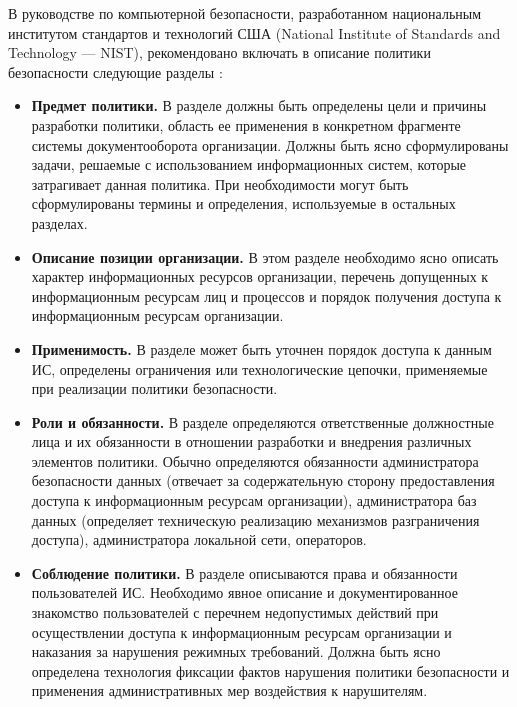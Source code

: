 В руководстве по компьютерной безопасности, разработанном национальным институтом стандартов и технологий
США (National Institute of Standards and Technology — NIST), рекомендовано включать в описание
политики безопасности следующие разделы  \autocite{nurzhanov}:
\begin{itemize}
	\item \textbf{Предмет политики.}
        В разделе должны быть определены цели и причины разработки политики, область ее применения
        в конкретном фрагменте системы документооборота организации. Должны быть ясно сформулированы
        задачи, решаемые с использованием информационных систем, которые затрагивает данная политика.
        При необходимости могут быть сформулированы термины и определения, используемые в остальных разделах.

    \item \textbf{Описание позиции организации.}
        В этом разделе необходимо ясно описать характер информационных ресурсов организации, перечень
        допущенных к информационным ресурсам лиц и процессов и порядок получения доступа к информационным
        ресурсам организации.

    \item \textbf{Применимость.}
        В разделе может быть уточнен порядок доступа к данным ИС, определены ограничения или технологические
        цепочки, применяемые при реализации политики безопасности.

    \item \textbf{Роли и обязанности.}
        В разделе определяются ответственные должностные лица и их обязанности в отношении разработки и
        внедрения различных элементов политики. Обычно определяются обязанности администратора безопасности
        данных (отвечает за содержательную сторону предоставления доступа к информационным ресурсам организации),
        администратора баз данных (определяет техническую реализацию механизмов разграничения доступа),
        администратора локальной сети, операторов.

    \item \textbf{Соблюдение политики.}
        В разделе описываются права и обязанности пользователей ИС. Необходимо явное описание и документированное
        знакомство пользователей с перечнем недопустимых действий при осуществлении доступа к информационным ресурсам
        организации и наказания за нарушения режимных требований. Должна быть ясно определена технология фиксации
        фактов нарушения политики безопасности и применения административных мер воздействия к нарушителям.
\end{itemize}

